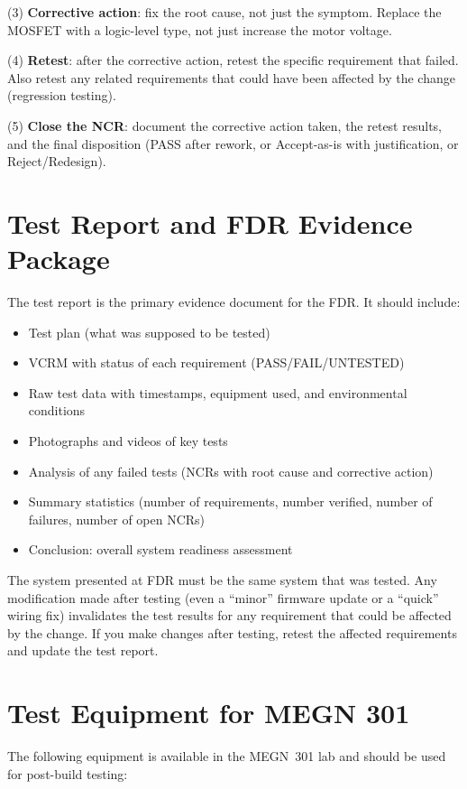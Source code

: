 \documentclass[11pt,letterpaper,twoside,openany]{book}
\begin{document}
(3) \textbf{Corrective action}: fix the root cause, not just the symptom. Replace the MOSFET with a logic-level type, not just increase the motor voltage.

(4) \textbf{Retest}: after the corrective action, retest the specific requirement that failed. Also retest any related requirements that could have been affected by the change (regression testing).

(5) \textbf{Close the NCR}: document the corrective action taken, the retest results, and the final disposition (PASS after rework, or Accept-as-is with justification, or Reject/Redesign).

\section{Test Report and FDR Evidence Package}
The test report is the primary evidence document for the FDR. It should include:

\begin{itemize}[nosep,leftmargin=1.5em]
\item Test plan (what was supposed to be tested)
\item VCRM with status of each requirement (PASS/FAIL/UNTESTED)
\item Raw test data with timestamps, equipment used, and environmental conditions
\item Photographs and videos of key tests
\item Analysis of any failed tests (NCRs with root cause and corrective action)
\item Summary statistics (number of requirements, number verified, number of failures, number of open NCRs)
\item Conclusion: overall system readiness assessment
\end{itemize}

\begin{warningbox}
The system presented at FDR must be the same system that was tested. Any modification made after testing (even a ``minor'' firmware update or a ``quick'' wiring fix) invalidates the test results for any requirement that could be affected by the change. If you make changes after testing, retest the affected requirements and update the test report.
\end{warningbox}

\section{Test Equipment for MEGN 301}
The following equipment is available in the MEGN~301 lab and should be used for post-build testing:
\end{document}
